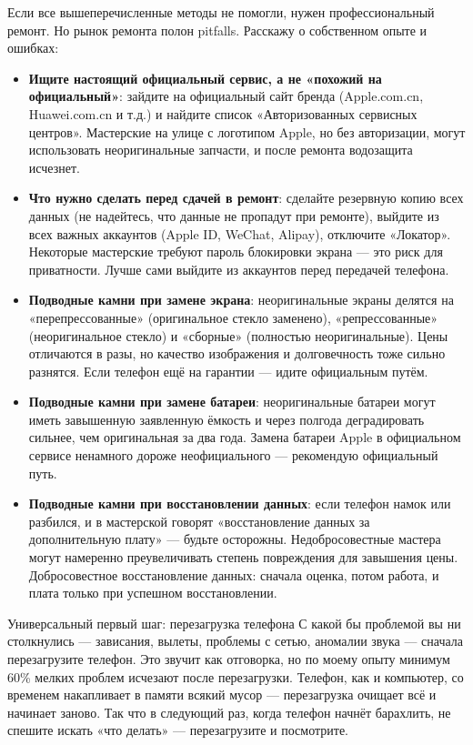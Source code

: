 
Если все вышеперечисленные методы не помогли, нужен профессиональный ремонт. Но рынок ремонта полон pitfalls. Расскажу о собственном опыте и ошибках:

\begin{itemize}
  \item \textbf{Ищите настоящий официальный сервис, а не «похожий на официальный»}: зайдите на официальный сайт бренда (Apple.com.cn, Huawei.com.cn и т.д.) и найдите список «Авторизованных сервисных центров». Мастерские на улице с логотипом Apple, но без авторизации, могут использовать неоригинальные запчасти, и после ремонта водозащита исчезнет.
  \item \textbf{Что нужно сделать перед сдачей в ремонт}: сделайте резервную копию всех данных (не надейтесь, что данные не пропадут при ремонте), выйдите из всех важных аккаунтов (Apple ID, WeChat, Alipay), отключите «Локатор». Некоторые мастерские требуют пароль блокировки экрана — это риск для приватности. Лучше сами выйдите из аккаунтов перед передачей телефона.
  \item \textbf{Подводные камни при замене экрана}: неоригинальные экраны делятся на «перепрессованные» (оригинальное стекло заменено), «репрессованные» (неоригинальное стекло) и «сборные» (полностью неоригинальные). Цены отличаются в разы, но качество изображения и долговечность тоже сильно разнятся. Если телефон ещё на гарантии — идите официальным путём.
  \item \textbf{Подводные камни при замене батареи}: неоригинальные батареи могут иметь завышенную заявленную ёмкость и через полгода деградировать сильнее, чем оригинальная за два года. Замена батареи Apple в официальном сервисе ненамного дороже неофициального — рекомендую официальный путь.
  \item \textbf{Подводные камни при восстановлении данных}: если телефон намок или разбился, и в мастерской говорят «восстановление данных за дополнительную плату» — будьте осторожны. Недобросовестные мастера могут намеренно преувеличивать степень повреждения для завышения цены. Добросовестное восстановление данных: сначала оценка, потом работа, и плата только при успешном восстановлении.
\end{itemize}

\begin{tcbwarn}{Универсальный первый шаг: перезагрузка телефона}
С какой бы проблемой вы ни столкнулись — зависания, вылеты, проблемы с сетью, аномалии звука — сначала перезагрузите телефон. Это звучит как отговорка, но по моему опыту минимум 60\% мелких проблем исчезают после перезагрузки. Телефон, как и компьютер, со временем накапливает в памяти всякий мусор — перезагрузка очищает всё и начинает заново. Так что в следующий раз, когда телефон начнёт барахлить, не спешите искать «что делать» — перезагрузите и посмотрите.

\end{tcbwarn}

